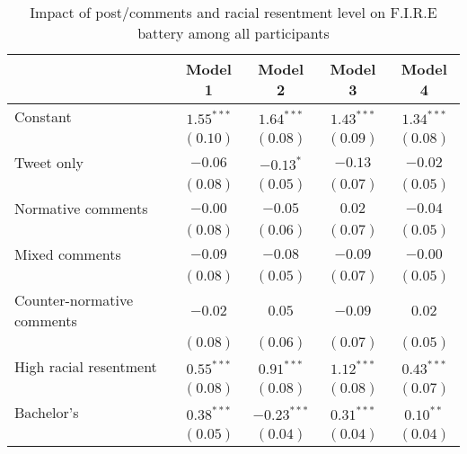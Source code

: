 
\begin{table}[h!]
\caption{Impact of post/comments and racial resentment level on F.I.R.E battery among all participants}
\begin{center}
\begin{scriptsize}
\begin{tabular}{l c c c c}
\toprule
 & Model 1 & Model 2 & Model 3 & Model 4 \\
\midrule
Constant                                            & $1.55^{***}$  & $1.64^{***}$  & $1.43^{***}$  & $1.34^{***}$ \\
                                                    & $(0.10)$      & $(0.08)$      & $(0.09)$      & $(0.08)$     \\
Tweet only                                          & $-0.06$       & $-0.13^{*}$   & $-0.13$       & $-0.02$      \\
                                                    & $(0.08)$      & $(0.05)$      & $(0.07)$      & $(0.05)$     \\
Normative comments                                  & $-0.00$       & $-0.05$       & $0.02$        & $-0.04$      \\
                                                    & $(0.08)$      & $(0.06)$      & $(0.07)$      & $(0.05)$     \\
Mixed comments                                      & $-0.09$       & $-0.08$       & $-0.09$       & $-0.00$      \\
                                                    & $(0.08)$      & $(0.05)$      & $(0.07)$      & $(0.05)$     \\
Counter-normative comments                          & $-0.02$       & $0.05$        & $-0.09$       & $0.02$       \\
                                                    & $(0.08)$      & $(0.06)$      & $(0.07)$      & $(0.05)$     \\
High racial resentment                              & $0.55^{***}$  & $0.91^{***}$  & $1.12^{***}$  & $0.43^{***}$ \\
                                                    & $(0.08)$      & $(0.08)$      & $(0.08)$      & $(0.07)$     \\
Bachelor's                                          & $0.38^{***}$  & $-0.23^{***}$ & $0.31^{***}$  & $0.10^{**}$  \\
                                                    & $(0.05)$      & $(0.04)$      & $(0.04)$      & $(0.04)$     \\

\end{tabular}
\end{scriptsize}
\end{center}
\end{table}
